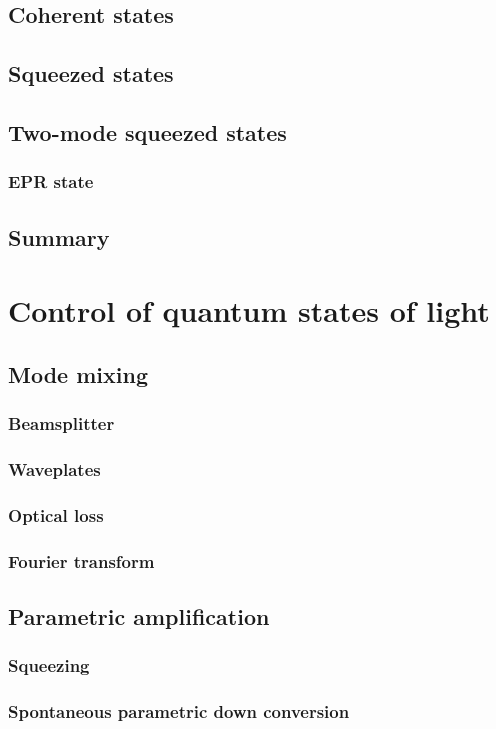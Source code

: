 \documentclass{book}
\begin{document}
\section{Coherent states}
\section{Squeezed states}
\section{Two-mode squeezed states}
\subsection{EPR state}
\section{Summary}

\chapter{Control of quantum states of light}
\section{Mode mixing}
\subsection{Beamsplitter}
\subsection{Waveplates}
\subsection{Optical loss}
\subsection{Fourier transform}
\section{Parametric amplification}
\subsection{Squeezing}
\subsection{Spontaneous parametric down conversion}
\end{document}
